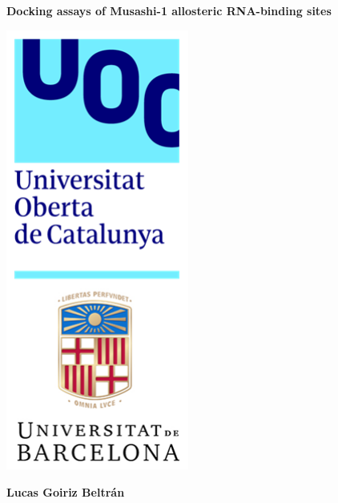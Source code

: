 \documentclass[a4paper,12pt]{article}
\newcommand{\thistitle}{Docking assays of Musashi-1 allosteric RNA-binding sites}
\newcommand{\thisauthor}{Lucas Goiriz Beltrán}
\begin{document}

\colorbox{uoccyan}{\parbox{0.84\textwidth}{
    \vspace{1.2cm}
    \color{uocblue}\fontsize{40pt}{1cm}\textbf{\thistitle}
    \vspace{1cm}
}}

\vspace{1cm}

\begin{minipage}{\paperwidth}
    \begin{minipage}{0.35\paperwidth}
        \includegraphics[width=6cm]{assets/UOC_UB_logos}
    \end{minipage}
    \hspace{0.001\paperwidth}
    \begin{minipage}{0.45\paperwidth}
        \fontsize{24pt}{1cm}\textbf{\thisauthor}\\
        
        \vspace{0.5cm}
        

\end{minipage}
\end{minipage}
\end{document}
